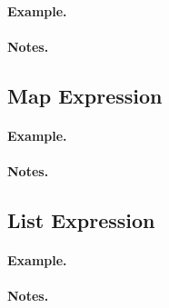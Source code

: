 \paragraph{Example.}

\paragraph{Notes.}


\subsection{Map Expression}
\label{c_expr_map}

\begin{syntax}
\end{syntax}

\paragraph{Example.}

\paragraph{Notes.}


\subsection{List Expression}
\label{c_expr_list}

\begin{syntax}
\end{syntax}

\paragraph{Example.}

\paragraph{Notes.}


